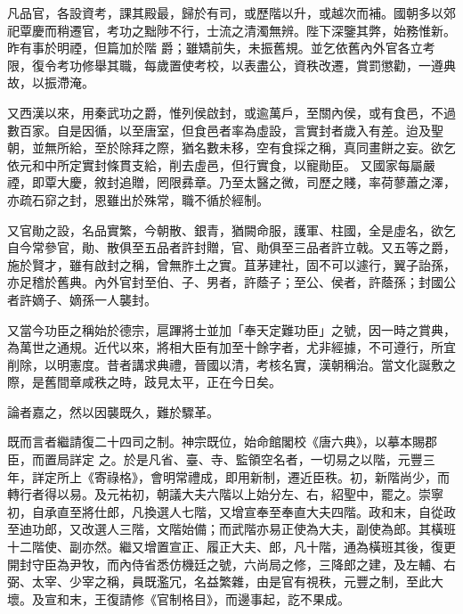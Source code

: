 \begin{pinyinscope}
 凡品官，各設資考，課其殿最，歸於有司，或歷階以升，或越次而補。國朝多以郊祀覃慶而稍遷官，考功之黜陟不行，士流之清濁無辨。陛下深鑒其弊，始務惟新。昨有事於明禋，但篇加於階
 爵；雖矯前失，未振舊規。並乞依舊內外官各立考限，復令考功修舉其職，每歲置使考校，以表盡公，資秩改遷，賞罰懲勸，一遵典故，以振滯淹。



 又西漢以來，用秦武功之爵，惟列侯啟封，或逾萬戶，至關內侯，或有食邑，不過數百家。自是因循，以至唐室，但食邑者率為虛設，言實封者歲入有差。迨及聖朝，並無所給，至於除拜之際，猶名數未移，空有食採之稱，真同畫餅之妄。欲乞依元和中所定實封條貫支給，削去虛邑，但行實食，以寵勛臣。
 又國家每屬嚴禋，即覃大慶，敘封追贈，罔限彞章。乃至太醫之微，司歷之賤，率荷蓼蕭之澤，亦疏石窌之封，恩雖出於殊常，職不循於經制。



 又官勛之設，名品實繁，今朝散、銀青，猶闕命服，護軍、柱國，全是虛名，欲乞自今常參官，勛、散俱至五品者許封贈，官、勛俱至三品者許立戟。又五等之爵，施於賢才，雖有啟封之稱，曾無胙土之實。苴茅建社，固不可以遽行，翼子詒孫，亦足稽於舊典。內外官封至伯、子、男者，許蔭子；至公、侯者，許蔭孫；封國公
 者許嫡子、嫡孫一人襲封。



 又當今功臣之稱始於德宗，扈蹕將士並加「奉天定難功臣」之號，因一時之賞典，為萬世之通規。近代以來，將相大臣有加至十餘字者，尤非經據，不可遵行，所宜削除，以明憲度。昔者講求典禮，晉國以清，考核名實，漢朝稱治。當文化誕敷之際，是舊間章咸秩之時，跂見太平，正在今日矣。



 論者嘉之，然以因襲既久，難於驟革。



 既而言者繼請復二十四司之制。神宗既位，始命館閣校《唐六典》，以摹本賜郡臣，而置局詳定
 之。於是凡省、臺、寺、監領空名者，一切易之以階，元豐三年，詳定所上《寄祿格》，會明常禮成，即用新制，遷近臣秩。初，新階尚少，而轉行者得以易。及元祐初，朝議大夫六階以上始分左、右，紹聖中，罷之。崇寧初，自承直至將仕郎，凡換選人七階，又增宣奉至奉直大夫四階。政和末，自從政至迪功郎，又改選人三階，文階始備；而武階亦易正使為大夫，副使為郎。其橫班十二階使、副亦然。繼又增置宣正、履正大夫、郎，凡十階，通為橫班其後，復更
 開封守臣為尹牧，而內侍省悉仿機廷之號，六尚局之修，三降郎之建，及左輔、右弼、太宰、少宰之稱，員既濫冗，名益繁雜，由是官有視秩，元豐之制，至此大壞。及宣和末，王復請修《官制格目》，而邊事起，訖不果成。




\end{pinyinscope}
